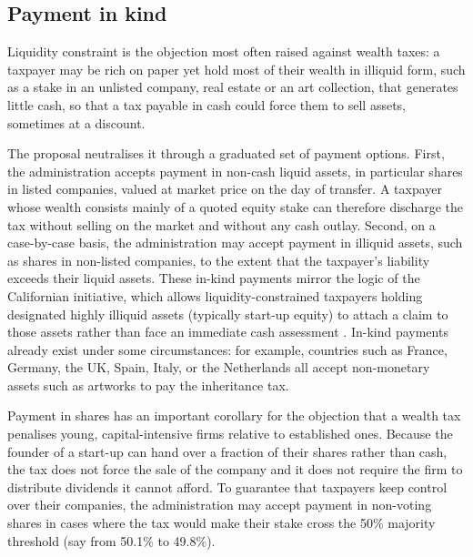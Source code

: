 \documentclass[../../main]{subfiles}
\begin{document}
\subsection{Payment in kind}\label{subsec:inkind}

Liquidity constraint is the objection most often raised against wealth taxes: a taxpayer may be rich on paper yet hold most of their wealth in illiquid form, such as a stake in an unlisted company, real estate or an art collection, that generates little cash, so that a tax payable in cash could force them to sell assets, sometimes at a discount. %

The proposal neutralises it through a graduated set of payment options. First, the administration accepts payment in non-cash liquid assets, in particular shares in listed companies, valued at market price on the day of transfer. %
A taxpayer whose wealth consists mainly of a quoted equity stake can therefore discharge the tax without selling on the market and without any cash outlay. Second, on a case-by-case basis, the administration may accept payment in illiquid assets, such as shares in non-listed companies, to the extent that the taxpayer's liability exceeds their liquid assets. These in-kind payments mirror the logic of the Californian initiative, which allows liquidity-constrained taxpayers holding designated highly illiquid assets (typically start-up equity) to attach a claim to those assets rather than face an immediate cash assessment \citep{CABillionaireTax2026}. In-kind payments already exist under some circumstances: for example, countries such as France, Germany, the UK, Spain, Italy, or the Netherlands all accept non-monetary assets such as artworks to pay the inheritance tax. 

Payment in shares has an important corollary for the objection that a wealth tax penalises young, capital-intensive firms relative to established ones. %
Because the founder of a start-up can hand over a fraction of their shares rather than cash, the tax does not force the sale of the company %
and it does not require the firm to distribute dividends it cannot afford. 
To guarantee that taxpayers keep control over their companies, 
the administration may accept payment in non-voting shares in cases where the tax would make their stake cross the 50\% majority threshold (say from 50.1\% to 49.8\%).  
\end{document}
